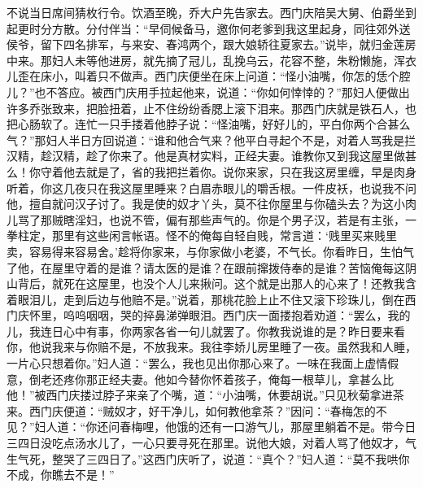 不说当日席间猜枚行令。饮酒至晚，乔大户先告家去。西门庆陪吴大舅、伯爵坐到起更时分方散。分付伴当：“早伺候备马，邀你何老爹到我这里起身，同往郊外送侯爷，留下四名排军，与来安、春鸿两个，跟大娘轿往夏家去。”说毕，就归金莲房中来。那妇人未等他进房，就先摘了冠儿，乱挽乌云，花容不整，朱粉懒施，浑衣儿歪在床小，叫着只不做声。西门庆便坐在床上问道：“怪小油嘴，你怎的恁个腔儿？”也不答应。被西门庆用手拉起他来，说道：“你如何悻悻的？”那妇人便做出许多乔张致来，把脸扭着，止不住纷纷香腮上滚下泪来。那西门庆就是铁石人，也把心肠软了。连忙一只手搂着他脖子说：“怪油嘴，好好儿的，平白你两个合甚么气？”那妇人半日方回说道：“谁和他合气来？他平白寻起个不是，对着人骂我是拦汉精，趁汉精，趁了你来了。他是真材实料，正经夫妻。谁教你又到我这屋里做甚么！你守着他去就是了，省的我把拦着你。说你来家，只在我这房里缠，早是肉身听着，你这几夜只在我这屋里睡来？白眉赤眼儿的嚼舌根。一件皮袄，也说我不问他，擅自就问汉子讨了。我是使的奴才丫头，莫不往你屋里与你磕头去？为这小肉儿骂了那贼瞎淫妇，也说不管，偏有那些声气的。你是个男子汉，若是有主张，一拳柱定，那里有这些闲言帐语。怪不的俺每自轻自贱，常言道：‘贱里买来贱里卖，容易得来容易舍。’趁将你家来，与你家做小老婆，不气长。你看昨日，生怕气了他，在屋里守着的是谁？请太医的是谁？在跟前撺拨侍奉的是谁？苦恼俺每这阴山背后，就死在这屋里，也没个人儿来揪问。这个就是出那人的心来了！还教我含着眼泪儿，走到后边与他赔不是。”说着，那桃花脸上止不住又滚下珍珠儿，倒在西门庆怀里，呜呜咽咽，哭的捽鼻涕弹眼泪。西门庆一面搂抱着劝道：“罢么，我的儿，我连日心中有事，你两家各省一句儿就罢了。你教我说谁的是？昨日要来看你，他说我来与你赔不是，不放我来。我往李娇儿房里睡了一夜。虽然我和人睡，一片心只想着你。”妇人道：“罢么，我也见出你那心来了。一味在我面上虚情假意，倒老还疼你那正经夫妻。他如今替你怀着孩子，俺每一根草儿，拿甚么比他！”被西门庆搂过脖子来亲了个嘴，道：“小油嘴，休要胡说。”只见秋菊拿进茶来。西门庆便道：“贼奴才，好干净儿，如何教他拿茶？”因问：“春梅怎的不见？”妇人道：“你还问春梅哩，他饿的还有一口游气儿，那屋里躺着不是。带今日三四日没吃点汤水儿了，一心只要寻死在那里。说他大娘，对着人骂了他奴才，气生气死，整哭了三四日了。”这西门庆听了，说道：“真个？”妇人道：“莫不我哄你不成，你瞧去不是！”

